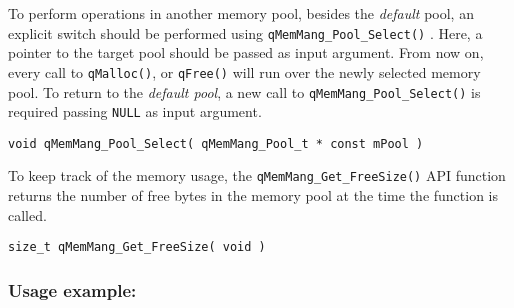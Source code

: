 To perform operations in another memory pool, besides the \textit{default} pool, an explicit switch should be performed using \lstinline{qMemMang_Pool_Select()} . Here, a pointer to the target pool should be passed as input argument.  From now on, every call to \lstinline{qMalloc()}, or \lstinline{qFree()} will run over the newly selected memory pool. To return to  the \textit{default pool},  a new call to  \lstinline{qMemMang_Pool_Select()} is required passing \lstinline{NULL} as input argument. \\ 

\begin{lstlisting}[style=CStyle]
void qMemMang_Pool_Select( qMemMang_Pool_t * const mPool )
\end{lstlisting}

To keep track of the memory usage, the \lstinline{qMemMang_Get_FreeSize()}  API function returns the number of free bytes in the memory pool at the time the function is called.
\begin{lstlisting}[style=CStyle]
size_t qMemMang_Get_FreeSize( void )
\end{lstlisting}

\subsubsection*{Usage example:}

